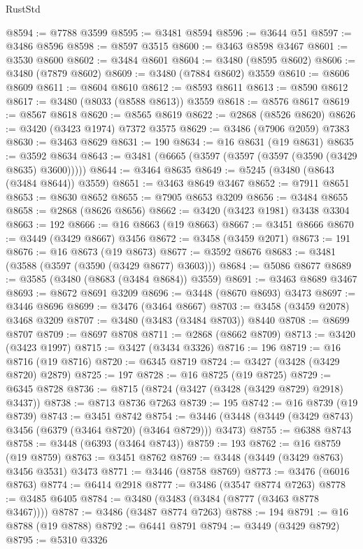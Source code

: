 \begin{lexlean}{RustStd}
\begin{coremodule}
{{{{{{{{{{{{{{{{{{{@8594 := @7788 @3599
@8595 := @3481 @8594
@8596 := @3644 @51
@8597 := @3486 @8596
@8598 := @8597 @3515
@8600 := @3463 @8598 @3467
@8601 := @3530 @8600
@8602 := @3484 @8601
@8604 := @3480 (@8595 @8602)
@8606 := @3480 (@7879 @8602)
@8609 := @3480 (@7884 @8602) @3559
@8610 := @8606 @8609
@8611 := @8604 @8610
@8612 := @8593 @8611
@8613 := @8590 @8612
@8617 := @3480 (@8033 (@8588 @8613)) @3559
@8618 := @8576 @8617
@8619 := @8567 @8618
@8620 := @8565 @8619
@8622 := @2868 (@8526 @8620)
@8626 := @3420 (@3423 @1974) @7372 @3575
@8629 := @3486 (@7906 @2059) @7383
@8630 := @3463 @8629
@8631 := 190
@8634 := @16 @8631 (@19 @8631)
@8635 := @3592 @8634
@8643 := @3481 (@6665 (@3597 (@3597 (@3597 (@3590 (@3429 @8635) @3600)))))
@8644 := @3464 @8635
@8649 := @5245 (@3480 (@8643 (@3484 @8644)) @3559)
@8651 := @3463 @8649 @3467
@8652 := @7911 @8651
@8653 := @8630 @8652
@8655 := @7905 @8653 @3209
@8656 := @3484 @8655
@8658 := @2868 (@8626 @8656)
@8662 := @3420 (@3423 @1981) @3438 @3304
@8663 := 192
@8666 := @16 @8663 (@19 @8663)
@8667 := @3451 @8666
@8670 := @3449 (@3429 @8667) @3456
@8672 := @3458 (@3459 @2071)
@8673 := 191
@8676 := @16 @8673 (@19 @8673)
@8677 := @3592 @8676
@8683 := @3481 (@3588 (@3597 (@3590 (@3429 @8677) @3603)))
@8684 := @5086 @8677
@8689 := @3585 (@3480 (@8683 (@3484 @8684)) @3559)
@8691 := @3463 @8689 @3467
@8693 := @8672 @8691 @3209
@8696 := @3448 (@8670 @8693) @3473
@8697 := @3446 @8696
@8699 := @3476 (@3464 @8667)
@8703 := @3458 (@3459 @2078) @3468 @3209
@8707 := @3480 (@3483 (@3484 @8703)) @8440
@8708 := @8699 @8707
@8709 := @8697 @8708
@8711 := @2868 (@8662 @8709)
@8713 := @3420 (@3423 @1997)
@8715 := @3427 (@3434 @3326)
@8716 := 196
@8719 := @16 @8716 (@19 @8716)
@8720 := @6345 @8719
@8724 := @3427 (@3428 (@3429 @8720) @2879)
@8725 := 197
@8728 := @16 @8725 (@19 @8725)
@8729 := @6345 @8728
@8736 := @8715 (@8724 (@3427 (@3428 (@3429 @8729) @2918) @3437))
@8738 := @8713 @8736 @7263
@8739 := 195
@8742 := @16 @8739 (@19 @8739)
@8743 := @3451 @8742
@8754 := @3446 (@3448 (@3449 (@3429 @8743) @3456 (@6379 (@3464 @8720) (@3464 @8729))) @3473)
@8755 := @6388 @8743
@8758 := @3448 (@6393 (@3464 @8743))
@8759 := 193
@8762 := @16 @8759 (@19 @8759)
@8763 := @3451 @8762
@8769 := @3448 (@3449 (@3429 @8763) @3456 @3531) @3473
@8771 := @3446 (@8758 @8769)
@8773 := @3476 (@6016 @8763)
@8774 := @6414 @2918
@8777 := @3486 (@3547 @8774 @7263)
@8778 := @3485 @6405
@8784 := @3480 (@3483 (@3484 (@8777 (@3463 @8778 @3467))))
@8787 := @3486 (@3487 @8774 @7263)
@8788 := 194
@8791 := @16 @8788 (@19 @8788)
@8792 := @6441 @8791
@8794 := @3449 (@3429 @8792)
@8795 := @5310 @3326
}}}}}}}}}}}}}}}}}}}
\end{coremodule}
\end{lexlean}
